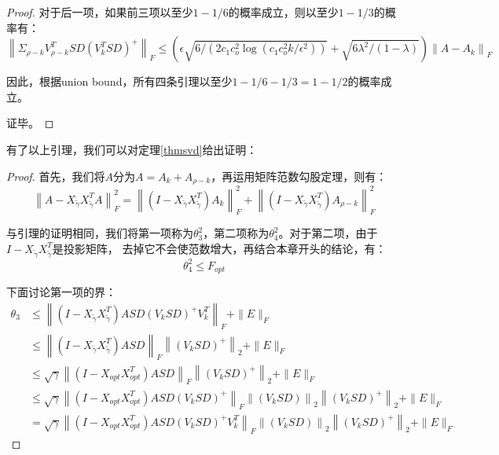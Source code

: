 \documentclass{ctexart}
\begin{document}
\begin{proof}
        对于后一项，如果前三项以至少$1-1/6$的概率成立，则以至少$1-1/3$的概率有：
        $$
        \left\|\Sigma_{\rho-k} V_{\rho-k}^{T} S D\left(V_{k}^{T} S D\right)^{+}\right\|_{F} \leq(\epsilon \sqrt{6 /\left(2 c_{1} c_{o}^{2} \log \left(c_{1} c_{o}^{2} k / \epsilon^{2}\right)\right)}+\sqrt{6 \lambda^{2} /(1-\lambda)})\left\|A-A_{k}\right\|_{F}
        $$

        因此，根据union bound，所有四条引理以至少$1-1/6-1/3= 1-1/2$的概率成立。

        证毕。
    \end{proof}

    有了以上引理，我们可以对定理\autoref{thmsvd}给出证明：
    \begin{proof}
        首先，我们将$A$分为$A=A_k + A_{\rho-k}$，再运用矩阵范数勾股定理\cite{boutsidis2014randomized}，则有：
        $$
        \left\|A-X_{\tilde{\gamma}} X_{\tilde{\gamma}}^{T} A\right\|_{F}^{2}=\left\|\left(I-X_{\tilde{\gamma}} X_{\tilde{\gamma}}^{T}\right) A_{k}\right\|_{F}^{2}+\left\|\left(I-X_{\tilde{\gamma}} X_{\tilde{\gamma}}^{T}\right) A_{\rho-k}\right\|_{F}^{2}
        $$

        与引理的证明相同，我们将第一项称为$\theta_3^2$，第二项称为$\theta_4^2$。对于第二项，由于$I-X_{\tilde{\gamma}} X_{\tilde{\gamma}}^T$是投影矩阵，
        去掉它不会使范数增大，再结合本章开头的结论，有：
        $$
        \theta_4^2 \leq F_{opt}
        $$

        下面讨论第一项的界：
        $$
        \begin{aligned} \theta_{3} & \leq\left\|\left(I-X_{\tilde{\gamma}} X_{\tilde{\gamma}}^{T}\right) A S D\left(V_{k} S D\right)^{+} V_{k}^{T}\right\|_{F}+\|E\|_{F} \\ & \leq\left\|\left(I-X_{\tilde{\gamma}} X_{\tilde{\gamma}}^{T}\right) A S D\right\|_{F}\left\|\left(V_{k} S D\right)^{+}\right\|_{2}+\|E\|_{F} \\ & \leq \sqrt{\gamma}\left\|\left(I-X_{o p t} X_{o p t}^{T}\right) A S D\right\|_{F}\left\|\left(V_{k} S D\right)^{+}\right\|_{2}+\|E\|_{F} \\ & \leq \sqrt{\gamma}\left\|\left(I-X_{o p t} X_{o p t}^{T}\right) A S D\left(V_{k} S D\right)^{+}\right\|_{F}\left\|\left(V_{k} S D\right)\right\|_{2}\left\|\left(V_{k} S D\right)^{+}\right\|_{2}+\|E\|_{F} \\ &=\sqrt{\gamma}\left\|\left(I-X_{o p t} X_{o p t}^{T}\right) A S D\left(V_{k} S D\right)^{+} V_{k}^{T}\right\|_{F}\left\|\left(V_{k} S D\right)\right\|_{2}\left\|\left(V_{k} S D\right)^{+}\right\|_{2}+\|E\|_{F} \end{aligned}
        $$


\end{proof}
\end{document}
